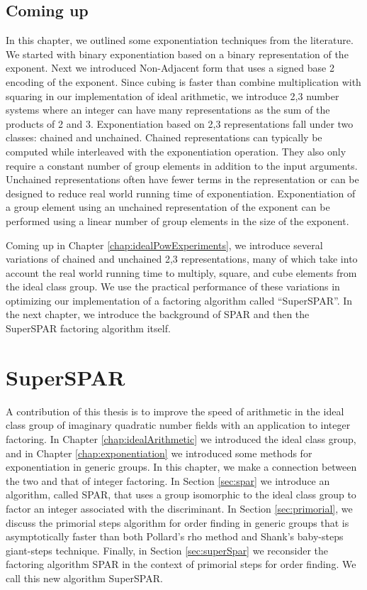 \documentclass{ucalgthes1}
\theoremstyle{definition}
\begin{document}
\bigbreak
\section{Coming up}

In this chapter, we outlined some exponentiation techniques from the literature.  We started with binary exponentiation based on a binary representation of the exponent.  Next we introduced Non-Adjacent form that uses a signed base 2 encoding of the exponent.  Since cubing is faster than combine multiplication with squaring in our implementation of ideal arithmetic, we introduce 2,3 number systems where an integer can have many representations as the sum of the products of 2 and 3.  Exponentiation based on 2,3 representations fall under two classes: chained and unchained.  Chained representations can typically be computed while interleaved with the exponentiation operation.  They also only require a constant number of group elements in addition to the input arguments.  Unchained representations often have fewer terms in the representation or can be designed to reduce real world running time of exponentiation.  Exponentiation of a group element using an unchained representation of the exponent can be performed using a linear number of group elements in the size of the exponent.

Coming up in Chapter \ref{chap:idealPowExperiments}, we introduce several variations of chained and unchained 2,3 representations, many of which take into account the real world running time to multiply, square, and cube elements from the ideal class group.  We use the practical performance of these variations in optimizing our implementation of a factoring algorithm called ``SuperSPAR''.  In the next chapter, we introduce the background of SPAR and then the SuperSPAR factoring algorithm itself.


\chapter{SuperSPAR}
\label{chap:superspar}

A contribution of this thesis is to improve the speed of arithmetic in the ideal class group of imaginary quadratic number fields with an application to integer factoring.  In Chapter \ref{chap:idealArithmetic} we introduced the ideal class group, and in Chapter \ref{chap:exponentiation} we introduced some methods for exponentiation in generic groups.  In this chapter, we make a connection between the two and that of integer factoring.  In Section \ref{sec:spar} we introduce an algorithm, called SPAR, that uses a group isomorphic to the ideal class group to factor an integer associated with the discriminant.  In Section \ref{sec:primorial}, we discuss the primorial steps algorithm for order finding in generic groups that is asymptotically faster than both Pollard's rho method and Shank's baby-steps giant-steps technique.  Finally, in Section \ref{sec:superSpar} we reconsider the factoring algorithm SPAR in the context of primorial steps for order finding.  We call this new algorithm SuperSPAR.
\end{document}
